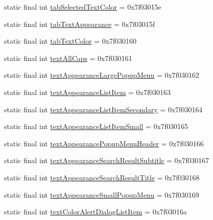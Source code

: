 \begin{DoxyCompactItemize}
\item 
static final int \mbox{\hyperlink{classandroid_1_1support_1_1design_1_1R_1_1attr_a56a5ff50e5095440d3066e6f3b932d1a}{tab\+Selected\+Text\+Color}} = 0x7f03015e
\item 
static final int \mbox{\hyperlink{classandroid_1_1support_1_1design_1_1R_1_1attr_aed3ef657b16086082eb107fc03a164bc}{tab\+Text\+Appearance}} = 0x7f03015f
\item 
static final int \mbox{\hyperlink{classandroid_1_1support_1_1design_1_1R_1_1attr_a208aa1427a7eeaee81f9154016d528d7}{tab\+Text\+Color}} = 0x7f030160
\item 
static final int \mbox{\hyperlink{classandroid_1_1support_1_1design_1_1R_1_1attr_ab755ba74b4f994f36ce6d0a4644b696a}{text\+All\+Caps}} = 0x7f030161
\item 
static final int \mbox{\hyperlink{classandroid_1_1support_1_1design_1_1R_1_1attr_a6a1db4cc00a586f8355a39fb984dfdca}{text\+Appearance\+Large\+Popup\+Menu}} = 0x7f030162
\item 
static final int \mbox{\hyperlink{classandroid_1_1support_1_1design_1_1R_1_1attr_adb54fe09750c1f317ebcb76f3581535a}{text\+Appearance\+List\+Item}} = 0x7f030163
\item 
static final int \mbox{\hyperlink{classandroid_1_1support_1_1design_1_1R_1_1attr_af4d372a9ba17fcf6ce061fc007d0e524}{text\+Appearance\+List\+Item\+Secondary}} = 0x7f030164
\item 
static final int \mbox{\hyperlink{classandroid_1_1support_1_1design_1_1R_1_1attr_a88255c007925fe926ee195f8ecd9102c}{text\+Appearance\+List\+Item\+Small}} = 0x7f030165
\item 
static final int \mbox{\hyperlink{classandroid_1_1support_1_1design_1_1R_1_1attr_a9fd27705390fdfa05f1175e77fc55215}{text\+Appearance\+Popup\+Menu\+Header}} = 0x7f030166
\item 
static final int \mbox{\hyperlink{classandroid_1_1support_1_1design_1_1R_1_1attr_a589eba96297a5cbf1c44b17b52462d47}{text\+Appearance\+Search\+Result\+Subtitle}} = 0x7f030167
\item 
static final int \mbox{\hyperlink{classandroid_1_1support_1_1design_1_1R_1_1attr_adfd41707242fb4edba11e3532b4e0e0c}{text\+Appearance\+Search\+Result\+Title}} = 0x7f030168
\item 
static final int \mbox{\hyperlink{classandroid_1_1support_1_1design_1_1R_1_1attr_a0456fca18bac043ad1ac869f567a37d2}{text\+Appearance\+Small\+Popup\+Menu}} = 0x7f030169
\item 
static final int \mbox{\hyperlink{classandroid_1_1support_1_1design_1_1R_1_1attr_a662d370f1b26a96ef3a6cfb38fd88262}{text\+Color\+Alert\+Dialog\+List\+Item}} = 0x7f03016a

\end{DoxyCompactItemize}
